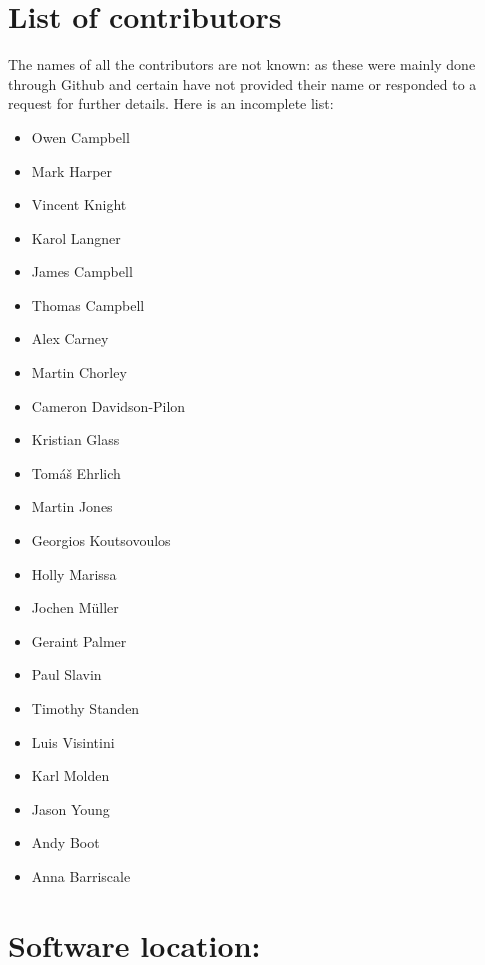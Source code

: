\documentclass{jors}
\begin{document}
\section*{List of contributors}

The names of all the contributors are not known: as these were mainly done
through Github and certain have not provided their name or responded to a
request for further details. Here is an incomplete list:

\begin{multicols}{2}
    \begin{itemize}[noitemsep,topsep=0pt]
        \item {Owen Campbell}
        \item {Mark Harper}
        \item {Vincent Knight}
        \item {Karol Langner}
        \item {James Campbell}
        \item {Thomas Campbell}
        \item {Alex Carney}
        \item {Martin Chorley}
        \item {Cameron Davidson-Pilon}
        \item {Kristian Glass}
        \item {Tom{\'a}{\v s} Ehrlich}
        \item {Martin Jones}
        \item {Georgios Koutsovoulos}
        \item {Holly Marissa}
        \item {Jochen M{\"u}ller}
        \item {Geraint Palmer}
        \item {Paul Slavin}
        \item {Timothy Standen}
        \item {Luis Visintini}
        \item {Karl Molden}
        \item {Jason Young}
        \item {Andy Boot}
        \item {Anna Barriscale}
    \end{itemize}
\end{multicols}

\section*{Software location:}
\end{document}
